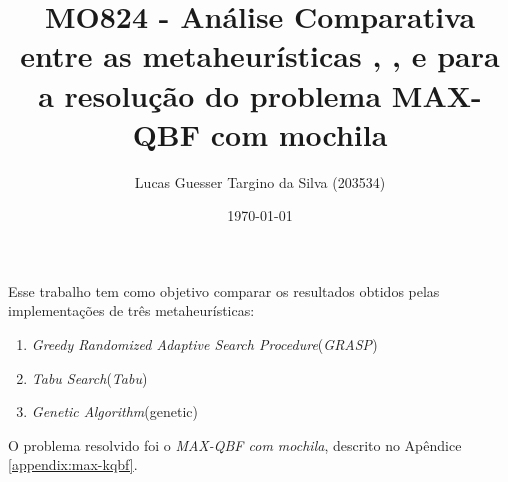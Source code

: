\documentclass[11pt]{article}
\author{Lucas Guesser Targino da Silva (203534)}
\date{\today}
\title{MO824 - Análise Comparativa entre as metaheurísticas \grasp, \tabu, e \genetic para a resolução do problema MAX-QBF com mochila}
\theoremstyle{definition}
\newcommand{\maxkqbffull}{\textit{MAX-QBF com mochila}\xspace}
\newcommand{\grasp}{\textit{GRASP}\xspace}
\newcommand{\graspfull}{\textit{Greedy Randomized Adaptive Search Procedure}\xspace}
\newcommand{\tabu}{\textit{Tabu}\xspace}
\newcommand{\tabufull}{\textit{Tabu Search}\xspace}
\newcommand{\geneticfull}{\textit{Genetic Algorithm}\xspace}
\newcommand{\aref}[1]{Apêndice \ref{#1}}
\begin{document}
\maketitle

Esse trabalho tem como objetivo comparar os resultados obtidos pelas implementações de três metaheurísticas:

\begin{enumerate}
    \item \graspfull (\grasp) \cite{bib:grasp}
    \item \tabufull (\tabu) \cite{bib:tabu}
    \item \geneticfull (genetic) \cite{bib:genetic}
\end{enumerate}

O problema resolvido foi o \maxkqbffull, descrito no \aref{appendix:max-kqbf}.





\begin{appendices}





\end{appendices}
\end{document}
